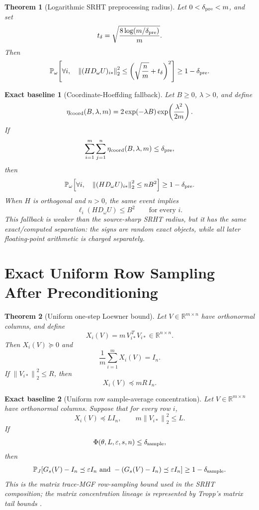 \documentclass[11pt]{article}
\newcommand{\R}{\mathbb{R}}
\newcommand{\Prob}{\mathbb{P}}
\newcommand{\Norm}[1]{\left\lVert #1\right\rVert_2}
\newcommand{\I}{I}
\newcommand{\eps}{\varepsilon}
\newtheorem{theorem}{Theorem}
\newtheorem*{baseline}{Exact baseline}
\theoremstyle{remark}
\begin{document}
\begin{theorem}[Logarithmic SRHT preprocessing radius]
Let \(0<\delta_{\rm pre}<m\), and set
\[
  t_\delta=\sqrt{\frac{8\log(m/\delta_{\rm pre})}{m}} .
\]
Then
\[
  \Prob_\omega\!\left[
    \forall i,\quad
    \Norm{(HD_\omega U)_{i*}}^2
    \le
    \left(\sqrt{\frac nm}+t_\delta\right)^2
  \right]
  \ge
  1-\delta_{\rm pre}.
\]
\end{theorem}

\begin{baseline}[Coordinate-Hoeffding fallback]
Let \(B\ge0\), \(\lambda>0\), and define
\[
  \eta_{\rm coord}(B,\lambda,m)
  =
  2\exp(-\lambda B)\exp\!\left(\frac{\lambda^2}{2m}\right).
\]
If
\[
  \sum_{i=1}^m\sum_{j=1}^n
    \eta_{\rm coord}(B,\lambda,m)
  \le
  \delta_{\rm pre},
\]
then
\[
  \Prob_\omega\!\left[
    \forall i,\quad
    \Norm{(HD_\omega U)_{i*}}^2\le nB^2
  \right]
  \ge
  1-\delta_{\rm pre}.
\]
When \(H\) is orthogonal and \(n>0\), the same event implies
\[
  \ell_i(HD_\omega U)\le B^2
  \qquad\text{for every }i.
\]
This fallback is weaker than the source-sharp SRHT radius, but it has the same
exact/computed separation: the signs are random exact objects, while all later
floating-point arithmetic is charged separately.
\end{baseline}

\section*{Exact Uniform Row Sampling After Preconditioning}

\begin{theorem}[Uniform one-step Loewner bound]
Let \(V\in\R^{m\times n}\) have orthonormal columns, and define
\[
  X_i(V)=m\,V_{i*}^{\,T}V_{i*}\in\R^{n\times n}.
\]
Then \(X_i(V)\succeq0\) and
\[
  \frac1m\sum_{i=1}^m X_i(V)=\I_n .
\]
If \(\Norm{V_{i*}}^2\le R\), then
\[
  X_i(V)\preceq mR\,\I_n .
\]
\end{theorem}

\begin{baseline}[Uniform row sample-average concentration]
Let \(V\in\R^{m\times n}\) have orthonormal columns.  Suppose that for every
row \(i\),
\[
  X_i(V)\preceq L\I_n,\qquad m\Norm{V_{i*}}^2\le L .
\]
If
\[
  \Phi(\theta,L,\eps,s,n)\le\delta_{\rm sample},
\]
then
\[
  \Prob_J\!\left[
    G_s(V)-\I_n\preceq\eps\I_n
    \ \text{and}\
    -(G_s(V)-\I_n)\preceq\eps\I_n
  \right]
  \ge
  1-\delta_{\rm sample}.
\]
This is the matrix trace-MGF row-sampling bound used in the SRHT composition;
the matrix concentration lineage is represented by Tropp's matrix tail bounds
\cite{Tropp2012}.
\end{baseline}
\end{document}
